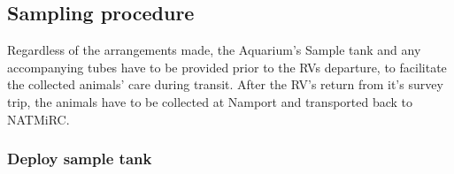 \documentclass[
  letterpaper,
  DIV=11,
  numbers=noendperiod]{scrreprt}
\begin{document}
\hypertarget{sampling-procedure}{%
\subsection{Sampling procedure}\label{sampling-procedure}}

Regardless of the arrangements made, the Aquarium's Sample tank and any
accompanying tubes have to be provided prior to the RVs departure, to
facilitate the collected animals' care during transit. After the RV's
return from it's survey trip, the animals have to be collected at
Namport and transported back to NATMiRC.

\hypertarget{deploy-sample-tank}{%
\subsubsection{Deploy sample tank}\label{deploy-sample-tank}}
\end{document}
